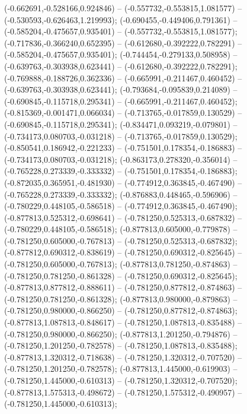  (-0.662691,-0.528166,0.924846) -- (-0.557732,-0.553815,1.081577) -- (-0.530593,-0.626463,1.219993);
 (-0.690455,-0.449406,0.791361) -- (-0.585204,-0.475657,0.935401) -- (-0.557732,-0.553815,1.081577);
 (-0.717836,-0.366240,0.652395) -- (-0.612680,-0.392222,0.782291) -- (-0.585204,-0.475657,0.935401);
 (-0.744454,-0.279133,0.508958) -- (-0.639763,-0.303938,0.623441) -- (-0.612680,-0.392222,0.782291);
 (-0.769888,-0.188726,0.362336) -- (-0.665991,-0.211467,0.460452) -- (-0.639763,-0.303938,0.623441);
 (-0.793684,-0.095839,0.214089) -- (-0.690845,-0.115718,0.295341) -- (-0.665991,-0.211467,0.460452);
 (-0.815369,-0.001471,0.066034) -- (-0.713765,-0.017859,0.130529) -- (-0.690845,-0.115718,0.295341);
 (-0.834471,0.093219,-0.079801) -- (-0.734173,0.080703,-0.031218) -- (-0.713765,-0.017859,0.130529);
 (-0.850541,0.186942,-0.221233) -- (-0.751501,0.178354,-0.186883) -- (-0.734173,0.080703,-0.031218);
 (-0.863173,0.278320,-0.356014) -- (-0.765228,0.273339,-0.333332) -- (-0.751501,0.178354,-0.186883);
 (-0.872035,0.365951,-0.481930) -- (-0.774912,0.363845,-0.467490) -- (-0.765228,0.273339,-0.333332);
 (-0.876883,0.448465,-0.596906) -- (-0.780229,0.448105,-0.586518) -- (-0.774912,0.363845,-0.467490);
 (-0.877813,0.525312,-0.698641) -- (-0.781250,0.525313,-0.687832) -- (-0.780229,0.448105,-0.586518);
 (-0.877813,0.605000,-0.779878) -- (-0.781250,0.605000,-0.767813) -- (-0.781250,0.525313,-0.687832);
 (-0.877812,0.690312,-0.838619) -- (-0.781250,0.690312,-0.825645) -- (-0.781250,0.605000,-0.767813);
 (-0.877813,0.781250,-0.874863) -- (-0.781250,0.781250,-0.861328) -- (-0.781250,0.690312,-0.825645);
 (-0.877813,0.877812,-0.888611) -- (-0.781250,0.877812,-0.874863) -- (-0.781250,0.781250,-0.861328);
 (-0.877813,0.980000,-0.879863) -- (-0.781250,0.980000,-0.866250) -- (-0.781250,0.877812,-0.874863);
 (-0.877813,1.087813,-0.848617) -- (-0.781250,1.087813,-0.835488) -- (-0.781250,0.980000,-0.866250);
 (-0.877813,1.201250,-0.794876) -- (-0.781250,1.201250,-0.782578) -- (-0.781250,1.087813,-0.835488);
 (-0.877813,1.320312,-0.718638) -- (-0.781250,1.320312,-0.707520) -- (-0.781250,1.201250,-0.782578);
 (-0.877813,1.445000,-0.619903) -- (-0.781250,1.445000,-0.610313) -- (-0.781250,1.320312,-0.707520);
 (-0.877813,1.575313,-0.498672) -- (-0.781250,1.575312,-0.490957) -- (-0.781250,1.445000,-0.610313);
